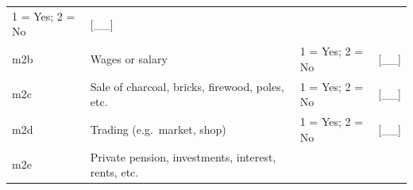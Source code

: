 \documentclass[12pt,a4paper]{book}
\theoremstyle{definition}
\theoremstyle{definition}
\theoremstyle{definition}
\theoremstyle{remark}
\begin{document}
\begin{longtable}[]{@{}llll@{}}
\begin{minipage}[t]{0.25\columnwidth}
1 = Yes; 2 = No\strut
\end{minipage} & \begin{minipage}[t]{0.13\columnwidth}\raggedright
{[}\_\_{]}\strut
\end{minipage}\tabularnewline
\begin{minipage}[t]{0.09\columnwidth}\raggedright
m2b\strut
\end{minipage} & \begin{minipage}[t]{0.41\columnwidth}\raggedright
Wages or salary\strut
\end{minipage} & \begin{minipage}[t]{0.25\columnwidth}\raggedright
1 = Yes; 2 = No\strut
\end{minipage} & \begin{minipage}[t]{0.13\columnwidth}\raggedright
{[}\_\_{]}\strut
\end{minipage}\tabularnewline
\begin{minipage}[t]{0.09\columnwidth}\raggedright
m2c\strut
\end{minipage} & \begin{minipage}[t]{0.41\columnwidth}\raggedright
Sale of charcoal, bricks, firewood, poles, etc.\strut
\end{minipage} & \begin{minipage}[t]{0.25\columnwidth}\raggedright
1 = Yes; 2 = No\strut
\end{minipage} & \begin{minipage}[t]{0.13\columnwidth}\raggedright
{[}\_\_{]}\strut
\end{minipage}\tabularnewline
\begin{minipage}[t]{0.09\columnwidth}\raggedright
m2d\strut
\end{minipage} & \begin{minipage}[t]{0.41\columnwidth}\raggedright
Trading (e.g.~market, shop)\strut
\end{minipage} & \begin{minipage}[t]{0.25\columnwidth}\raggedright
1 = Yes; 2 = No\strut
\end{minipage} & \begin{minipage}[t]{0.13\columnwidth}\raggedright
{[}\_\_{]}\strut
\end{minipage}\tabularnewline
\begin{minipage}[t]{0.09\columnwidth}\raggedright
m2e\strut
\end{minipage} & \begin{minipage}[t]{0.41\columnwidth}\raggedright
Private pension, investments, interest, rents, etc.\strut

\end{minipage}
\end{longtable}
\end{document}
